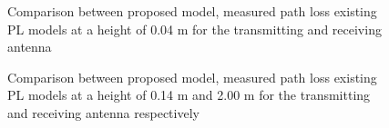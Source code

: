 \begin{figure}[!htbp]
\centering

\caption{Comparison between proposed model, measured path loss existing PL models at a height of 0.04 m for the transmitting and receiving antenna}
\label{ourModel1}
\end{figure}

\begin{figure}[H]
\centering

\caption{Comparison between proposed model, measured path loss existing PL models at a height of 0.14 m and 2.00 m for the transmitting and receiving antenna respectively}
\label{ourModel2}
\end{figure}








     
